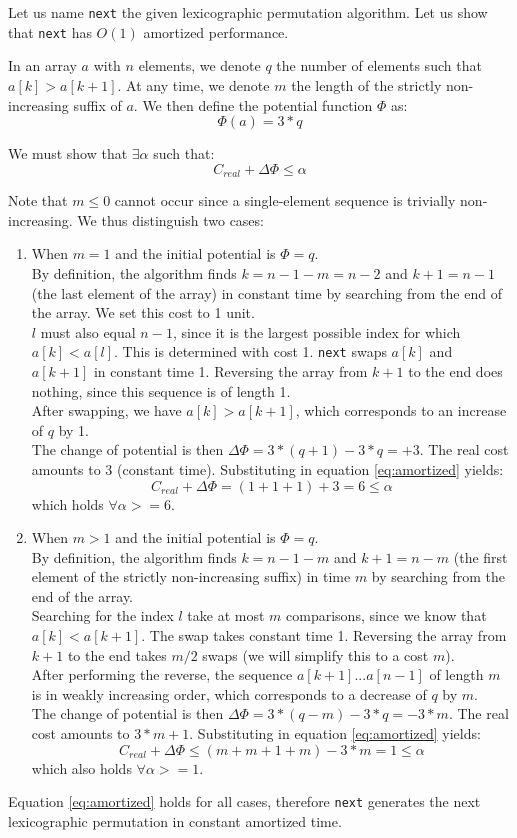 Let us name \texttt{next} the given lexicographic permutation algorithm. Let us show that \texttt{next} has $O(1)$ amortized performance.

In an array $a$ with $n$ elements, we denote $q$ the number of elements such that $a[k] > a[k+1]$. At any time, we denote $m$ the length of the strictly non-increasing suffix of $a$.
We then define the potential function $\Phi$ as:
\[
  \Phi(a) = 3 * q
\]

We must show that $\exists \alpha$ such that:
\begin{equation} \label{eq:amortized}
  C_{real} + \Delta\Phi \leq \alpha
\end{equation}

Note that $m \leq 0$ cannot occur since a single-element sequence is trivially non-increasing. We thus distinguish two cases:
\begin{enumerate}
  \item When $m = 1$ and the initial potential is $\Phi = q$.\\
By definition, the algorithm finds $k = n - 1 - m = n - 2$ and $k + 1 = n - 1$ (the last element of the array) in constant time by searching from the end of the array. We set this cost to 1 unit.\\
$l$ must also equal $n - 1$, since it is the largest possible index for which $a[k] < a[l]$. This is determined with cost 1. \texttt{next} swaps $a[k]$ and $a[k+1]$ in constant time 1. Reversing the array from $k + 1$ to the end does nothing, since this sequence is of length 1.\\
After swapping, we have $a[k] > a[k + 1]$, which corresponds to an increase of $q$ by 1.\\

The change of potential is then $\Delta\Phi = 3 * (q+1) - 3 * q = +3$. The real cost amounts to 3 (constant time). Substituting in equation \ref{eq:amortized} yields:
\[
  C_{real} + \Delta\Phi = (1 + 1 + 1) + 3 = 6 \leq \alpha
\]
which holds $\forall \alpha >= 6$.

  \item When $m > 1$ and the initial potential is $\Phi = q$.\\
By definition, the algorithm finds $k = n - 1 - m$ and $k + 1 = n - m$ (the first element of the strictly non-increasing suffix) in time $m$ by searching from the end of the array.\\
Searching for the index $l$ take at most $m$ comparisons, since we know that $a[k] < a[k+1]$. The swap takes constant time 1. Reversing the array from $k + 1$ to the end takes $m / 2$ swaps (we will simplify this to a cost $m$).\\
After performing the reverse, the sequence $a[k+1]...a[n-1]$ of length $m$ is in weakly increasing order, which corresponds to a decrease of $q$ by $m$.\\

The change of potential is then $\Delta\Phi = 3 * (q - m) - 3 * q = -3 * m$. The real cost amounts to $3 * m + 1$. Substituting in equation \ref{eq:amortized} yields:
\[
  C_{real} + \Delta\Phi \leq (m + m + 1 + m) - 3 * m = 1 \leq \alpha
\]
which also holds $\forall \alpha >= 1$.
\end{enumerate}

Equation \ref{eq:amortized} holds for all cases, therefore \texttt{next} generates the next lexicographic permutation in constant amortized time.
